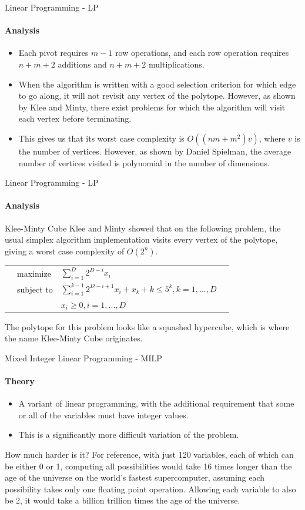 \documentclass{beamer}
\begin{document}
	\begin{frame}{Linear Programming - LP}
		\framesubtitle{Analysis}
		\begin{itemize}
			\item Each pivot requires $m-1$ row operations, and each row operation requires $n+m+2$ additions and $n+m+2$ multiplications.
			\item When the algorithm is written with a good selection criterion for which edge to go along, it will not revisit any vertex of the polytope. However, as shown by Klee and Minty, there exist problems for which the algorithm will visit each vertex before terminating. 
			\item This gives us that its worst case complexity is $O((nm + m^2)v)$, where $v$ is the number of vertices. However, as shown by Daniel Spielman, the average number of vertices visited is polynomial in the number of dimensions.
		\end{itemize}
	\end{frame}
	
	\begin{frame}{Linear Programming - LP}
		\framesubtitle{Analysis}
		\begin{block}{Klee-Minty Cube}
			Klee and Minty showed that on the following problem, the usual simplex algorithm implementation visits every vertex of the polytope, giving a worst case complexity of $O(2^n)$.
			\begin{tabularx}{\textwidth}{X l l X}
				& maximize		& $\sum_{i=1}^{D}2^{D-i}x_i$		& \\
				& subject to	& $\sum_{i=1}^{k-1}2^{D-i+1}x_i + x_k+k\leq 5^k, k=1,...,D$	& \\
				& 				& $x_i \geq 0, i=1,...,D$
			\end{tabularx}
			The polytope for this problem looks like a squashed hypercube, which is where the name Klee-Minty Cube originates.
		\end{block}
	\end{frame}
	
	\begin{frame}{Mixed Integer Linear Programming - MILP}
		\framesubtitle{Theory}
		\begin{itemize}
			\item A variant of linear programming, with the additional requirement that some or all of the variables must have integer values. 
			\item This is a significantly more difficult variation of the problem.
		\end{itemize}
		\begin{block}{How much harder is it?}
			For reference, with just 120 variables, each of which can be either 0 or 1, computing all possibilities would take 16 times longer than the age of the universe on the world's fastest supercomputer, assuming each possibility takes only one floating point operation. Allowing each variable to also be 2, it would take a billion trillion times the age of the universe.
		\end{block}
	\end{frame}
	
\end{document}
